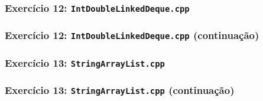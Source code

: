 \documentclass[aspectratio=169]{beamer}
\begin{document}
\begin{frame}[fragile]\frametitle{Exercício 12: \texttt{IntDoubleLinkedDeque.cpp}}
\fontsize{3pt}{5pt}\selectfont{

}
\end{frame}

\begin{frame}[fragile]\frametitle{Exercício 12: \texttt{IntDoubleLinkedDeque.cpp} (continuação)}
\fontsize{3pt}{5pt}\selectfont{

}
\end{frame}

\begin{frame}[fragile]\frametitle{Exercício 13: \texttt{StringArrayList.cpp}}
\fontsize{3pt}{5pt}\selectfont{

}
\end{frame}

\begin{frame}[fragile]\frametitle{Exercício 13: \texttt{StringArrayList.cpp} (continuação)}
\fontsize{3pt}{5pt}\selectfont{

}
\end{frame}

\end{document}
